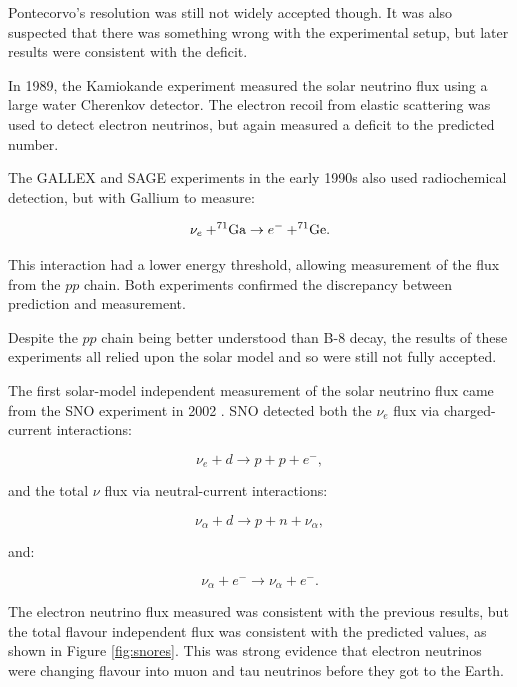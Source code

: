 Pontecorvo's resolution was still not widely accepted though. It was also suspected that there was something wrong with the experimental setup, but later results were consistent with the deficit.

In 1989, the Kamiokande experiment \cite{kamiokande} measured the solar neutrino flux using a large water Cherenkov detector. The electron recoil from elastic scattering was used to detect electron neutrinos, but again measured a deficit to the predicted number.

The GALLEX \cite{gallex} and SAGE \cite{sage} experiments in the early 1990s also used radiochemical detection, but with Gallium to measure:

\begin{equation}
\nu_e + ^{71}\negmedspace \text{Ga} \rightarrow e^- + ^{71}\negmedspace \text{Ge}.
\end{equation}

This interaction had a lower energy threshold, allowing measurement of the flux from the $pp$ chain. Both experiments confirmed the discrepancy between prediction and measurement.

Despite the $pp$ chain being better understood than B-8 decay, the results of these experiments all relied upon the solar model and so were still not fully accepted.

The first solar-model independent measurement of the solar neutrino flux came from the SNO experiment in 2002 \cite{snoresult}. SNO detected both the $\nu_e$ flux via charged-current interactions:

\begin{equation}
\nu_e + d  \rightarrow p + p + e^-,
\end{equation}

and the total $\nu$ flux via neutral-current interactions:

\begin{equation}
\nu_{\alpha} + d  \rightarrow p + n + \nu_{\alpha},
\end{equation}

and:

\begin{equation}
\nu_{\alpha} + e^-  \rightarrow \nu_{\alpha} + e^-.
\end{equation}

The electron neutrino flux measured was consistent with the previous results, but the total flavour independent flux was consistent with the predicted values, as shown in Figure \ref{fig:snores}. This was strong evidence that electron neutrinos were changing flavour into muon and tau neutrinos before they got to the Earth.

